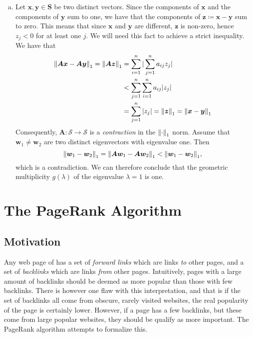\documentclass[12pt, oneside, article, a4paper]{memoir}
\newcommand{\mat}[1]{\bm{#1}}
\begin{document}
\begin{enumerate}[a)]
    \item Let \( \mat{x}, \mat{y} \in \mat{S} \) be two distinct vectors. Since
        the components of \( \mat{x} \) and the components of \( \mat{y} \) sum
        to one, we have that the components of \( \mat{z} \coloneqq \mat{x} -
        \mat{y} \) sum to zero. This means that since \( \mat{x} \) and \(
        \mat{y} \) are different, \( \mat{z} \) is non-zero, hence \(z_j < 0 \)
        for at least one \( j \). We will need this fact to achieve a strict
        inequality. We have that
        \begin{align}
            \begin{split}
            \norm{\mat{Ax} - \mat{Ay}}_1 = \norm{\mat{Az}}_1 &= \sum_{i = 1}^n |\sum_{j=1}^n a_{ij} z_j| \\
                                                             &< \sum_{j = 1}^n \sum_{i=1}^n a_{ij}|z_j| \\ 
                                                             &= \sum_{j=1}^n |z_j| = \norm{\mat{z}}_1 = \norm{\mat{x} - \mat{y}}_1
    \end{split}
        \end{align}
        Consequently, \( \mat{A} \colon \mathcal{S} \to \mathcal{S} \) is a
        \emph{contraction} in the \( \norm{\cdot}_1 \) norm.  Assume that \(
        \mat{w}_1 \neq \mat{w}_2 \) are two distinct eigenvectors with
        eigenvalue one. Then
        \begin{equation}
            \norm{\mat{w}_1 - \mat{w}_2}_1 = \norm{\mat{Aw}_1 - \mat{Aw}_2}_1 < \norm{\mat{w}_1 - \mat{w}_2}_1,
        \end{equation}
        which is a contradiction. We can therefore conclude that the geometric
        multiplicity \( g(\lambda) \) of the eigenvalue \( \lambda = 1 \) is
        one.
\end{enumerate}

\chapter{The PageRank Algorithm}

\section{Motivation}

Any web page of has a set of \emph{forward links} which are links \emph{to}
other pages, and a set of \emph{backlinks} which are links \emph{from} other
pages. Intuitively, pages with a large amount of backlinks should be deemed as
more popular than those with few backlinks. There is however one flaw with this
interpretation, and that is if the set of backlinks all come from obscure,
rarely visited websites, the real popularity of the page is certainly lower.
However, if a page has a few backlinks, but these come from large popular
websites, they should be qualify as more important. The PageRank algorithm
attempts to formalize this.
\end{document}
